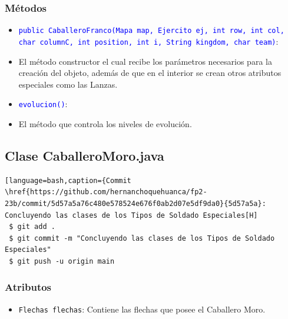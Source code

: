 \documentclass{article}
\begin{document}
\subsubsection{Métodos}
\begin{itemize}
    \item \texttt{\textcolor{blue}{public CaballeroFranco(Mapa map, Ejercito ej, int row, int col, char columnC, int position, int i, String kingdom, char team)}}: 
    \item El método constructor el cual recibe los parámetros necesarios para la creación del objeto, además de que en el interior se crean otros atributos especiales como las Lanzas.
\end{itemize}

\begin{itemize}
    \item \texttt{\textcolor{blue}{evolucion()}}: 
    \item El método que controla los niveles de evolución. 
\end{itemize}



\newpage
\subsection{Clase CaballeroMoro.java}
\begin{lstlisting}[language=bash,caption={Commit \href{https://github.com/hernanchoquehuanca/fp2-23b/commit/5d57a5a76c480e578524e676f0ab2d07e5df9da0}{5d57a5a}: Concluyendo las clases de los Tipos de Soldado Especiales[H]
 $ git add .
 $ git commit -m "Concluyendo las clases de los Tipos de Soldado Especiales"			
 $ git push -u origin main
\end{lstlisting}

\subsubsection{Atributos}
\begin{itemize}
    \item \texttt{Flechas flechas}: Contiene las flechas que posee el Caballero Moro.
\end{itemize}

\end{document}
